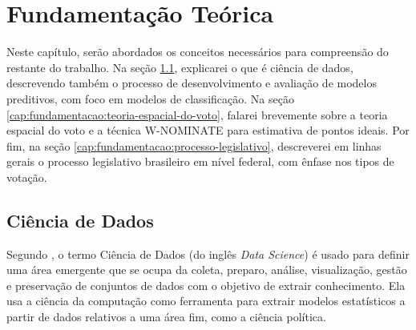 \documentclass[a4paper,titlepage]{ppgi}\usepackage[]{graphicx}\usepackage[]{color}
\begin{document}
\newpage
\cleardoublepage
\Introducao


%
%






\chapter{Fundamentação Teórica}\label{cap:fundamentacao}

Neste capítulo, serão abordados os conceitos necessários para compreensão do
restante do trabalho. Na seção \ref{cap:fundamentacao:ciencia-de-dados},
explicarei o que é ciência de dados, descrevendo também o processo de
desenvolvimento e avaliação de modelos preditivos, com foco em modelos de
classificação. Na seção \ref{cap:fundamentacao:teoria-espacial-do-voto},
falarei brevemente sobre a teoria espacial do voto e a técnica W-NOMINATE para
estimativa de pontos ideais. Por fim, na seção
\ref{cap:fundamentacao:processo-legislativo}, descreverei em linhas gerais o
processo legislativo brasileiro em nível federal, com ênfase nos tipos de
votação.

\section{Ciência de Dados}
\label{cap:fundamentacao:ciencia-de-dados}

Segundo , o termo Ciência de Dados (do inglês
\emph{Data Science}) é usado para definir uma área emergente que se ocupa da
coleta, preparo, análise, visualização, gestão e preservação de conjuntos de
dados com o objetivo de extrair conhecimento. Ela usa a ciência da computação
como ferramenta para extrair modelos estatísticos a partir de dados relativos a
uma área fim, como a ciência política.
\end{document}
